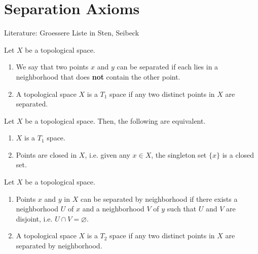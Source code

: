 \chapter{Separation Axioms}
Literature: Groessere Liste in Sten, Seibeck

\begin{defbox}
    \begin{definition}[\(T_1\) Space]
        Let \(X\) be a {\color{mathif}topological space}.
        \begin{enumerate}
            \item We say that two {\color{mathobj}points} \(x\) and \(y\) can be {\color{maththen}separated} if each lies in a {\color{mathif}neighborhood} that does \textbf{not} contain the other point.

            \item A {\color{mathobj}topological space} \(X\) is a {\color{maththen}\(T_1\) space} if any two distinct points in \(X\) are {\color{mathif}separated}.
        \end{enumerate}
    \end{definition}
\end{defbox}
%
\begin{thmbox}
    \begin{proposition}
        Let \(X\) be a {\color{mathif}topological space}. Then, the following are {\color{mathrem}equivalent}.
        \begin{enumerate}
            \item \(X\) is a {\color{maththen}\(T_1\) space}.
            \item {\color{mathif}Points} are {\color{maththen}closed} in \(X\), i.e. given any \(x \in X\), the {\color{mathif}singleton} set \(\{x\}\) is a {\color{maththen}closed} set.
        \end{enumerate}
    \end{proposition}
\end{thmbox}
%
\begin{defbox}
    \begin{definition}[\(T_2\) Space]
        Let \(X\) be a {\color{mathif}topological space}.
        \begin{enumerate}
            \item {\color{mathobj}Points} \(x\) and \(y\) in \(X\) can be {\color{maththen}separated by neighborhood} if there exists a {\color{mathif}neighborhood} \(U\) of \(x\) and a {\color{mathif}neighborhood} \(V\) of \(y\) such that \(U\) and \(V\) are {\color{mathif}disjoint}, i.e. \(U \cap V = \varnothing\).
            \item A {\color{mathobj}topological space} \(X\) is a {\color{maththen}\(T_2\) space} if any two distinct points in \(X\) are {\color{mathif}separated by neighborhood}.
        \end{enumerate}
    \end{definition}
\end{defbox}
